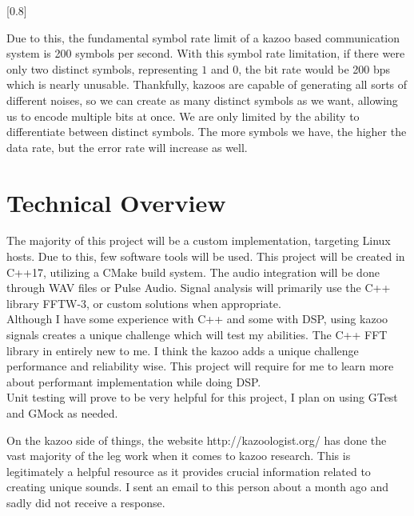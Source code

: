 \documentclass[]{article}
\begin{document}
[0.8\textwidth]

Due to this, the fundamental symbol rate limit of a kazoo based communication
system is 200 symbols per second. With this symbol rate limitation, if there
were only two distinct symbols, representing $1$ and $0$, the bit rate would be
200 bps which is nearly unusable. Thankfully, kazoos are capable of generating
all sorts of different noises, so we can create as many distinct symbols as we
want, allowing us to encode multiple bits at once. We are only limited by the ability to differentiate between distinct symbols. The more symbols we have, the higher the data rate, but the error rate will increase as well. \\

\section{Technical Overview}

The majority of this project will be a custom implementation, targeting Linux hosts. Due to this, few software tools will be used. This project will be created in C++17, utilizing a CMake build system. The audio integration will be done through WAV files or Pulse Audio. Signal analysis will primarily use the C++ library FFTW-3, or custom solutions when appropriate. \\

Although I have some experience with C++ and some with DSP, using kazoo signals creates
a unique challenge which will test my abilities. The C++ FFT library in entirely
new to me. I think the kazoo adds a unique challenge performance and reliability wise. This project will require for me to learn more about performant implementation while doing DSP. \\

Unit testing will prove to be very helpful for this project, I plan on using GTest and GMock as needed.

On the kazoo side of things, the website http://kazoologist.org/ has done the vast majority of the leg work when it comes to kazoo research. This is legitimately a helpful resource as it provides crucial information related to creating unique sounds. I sent an email to this person about a month ago and sadly did not receive a response.
\end{document}
